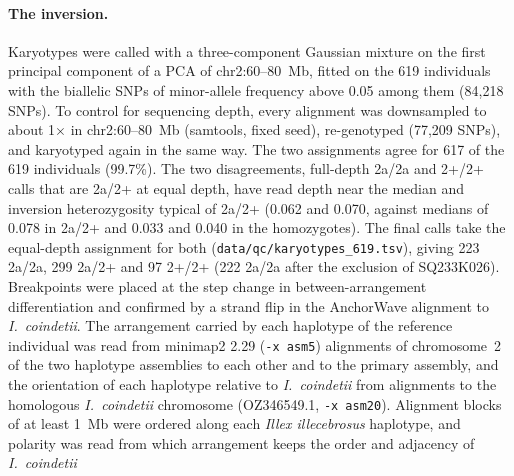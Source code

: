 \documentclass[11pt]{article}
\newcommand{\illex}{\textit{Illex illecebrosus}}
\newcommand{\coin}{\textit{I.\ coindetii}}
\begin{document}
\paragraph{The inversion.}
Karyotypes were called with a three-component Gaussian mixture on the first principal component of a PCA of
chr2:60--80~Mb, fitted on the 619 individuals with the biallelic SNPs of minor-allele frequency above 0.05 among them (84{,}218 SNPs). To control for sequencing depth, every alignment was downsampled to about 1$\times$ in chr2:60--80~Mb (samtools, fixed seed), re-genotyped (77{,}209 SNPs), and karyotyped again in the same way. The two assignments agree for 617 of the 619 individuals (99.7\%). The two disagreements, full-depth 2a/2a and 2+/2+ calls that are 2a/2+ at equal depth, have read depth near the median and inversion heterozygosity typical of 2a/2+ (0.062 and 0.070, against medians of 0.078 in 2a/2+ and 0.033 and 0.040 in the homozygotes). The final calls take the equal-depth assignment for both (\texttt{data/qc/karyotypes\_619.tsv}), giving 223 2a/2a, 299 2a/2+ and 97 2+/2+ (222 2a/2a after the exclusion of SQ233K026). Breakpoints were placed at the step change in between-arrangement differentiation and confirmed by a strand flip
in the AnchorWave alignment to \coin{}. The arrangement carried by each haplotype of the reference individual was
read from minimap2 2.29 (\texttt{-x asm5}) alignments of chromosome~2 of the two haplotype assemblies to each other
and to the primary assembly, and the orientation of each haplotype relative to \coin{} from alignments to the
homologous \coin{} chromosome (OZ346549.1, \texttt{-x asm20}). Alignment blocks of at least 1~Mb were ordered along
each \illex{} haplotype, and polarity was read from which arrangement keeps the order and adjacency of \coin{}
\end{document}
